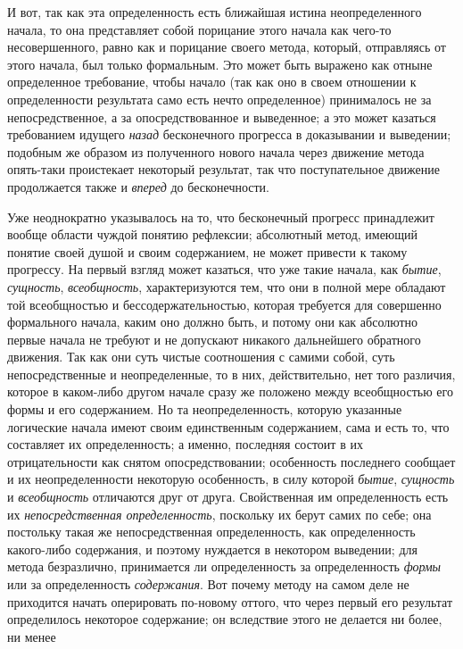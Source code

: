 {{И вот, так как эта определенность есть ближайшая истина
неопределенного начала, то она представляет собой порицание этого начала
как чего-то несовершенного, равно как и порицание своего метода, который,
отправляясь от этого начала, был только формальным. Это может быть выражено
как отныне определенное требование, чтобы начало (так как оно в своем
отношении к определенности результата само есть нечто определенное)
принималось не за непосредственное, а за опосредствованное и
выведенное; а это может казаться требованием идущего
{\em назад} бесконечного
прогресса в доказывании и выведении; подобным же образом из полученного
нового начала через движение метода опять-таки проистекает некоторый
результат, так что поступательное движение продолжается также и
{\em вперед} до бесконечности.

Уже неоднократно указывалось на то, что бесконечный прогресс
принадлежит вообще области чуждой понятию рефлексии; абсолютный метод,
имеющий понятие своей душой и своим содержанием, не может привести к такому
прогрессу. На первый взгляд может казаться, что уже такие начала, как
{\em бытие}, {\em сущность}, {\em всеобщность},
характеризуются тем, что они в полной мере обладают той
всеобщностью и бессодержательностью, которая требуется для совершенно
формального начала, каким оно должно быть, и потому они как абсолютно
первые начала не требуют и не допускают никакого дальнейшего обратного
движения. Так как они суть чистые соотношения с самими собой, суть
непосредственные и неопределенные, то в них, действительно, нет того
различия, которое в каком-либо другом начале сразу же положено между
всеобщностью его формы и его содержанием. Но та неопределенность, которую
указанные логические начала имеют своим единственным содержанием, сама и
есть то, что составляет их определенность; а именно, последняя состоит в их
отрицательности как снятом опосредствовании; особенность последнего
сообщает и их неопределенности некоторую особенность, в силу которой
{\em бытие}, {\em сущность} и {\em всеобщность}
отличаются друг от друга. Свойственная им определенность есть
их {\em непосредственная
определенность}, поскольку их берут самих по себе; она
постольку такая же непосредственная определенность, как определенность
какого-либо содержания, и поэтому нуждается в некотором выведении; для
метода безразлично, принимается ли определенность за определенность
{\em формы} или за определенность {\em содержания}.
Вот почему методу на самом деле не приходится начать
оперировать по-новому оттого, что через первый его результат определилось
некоторое содержание; он вследствие этого не делается ни более, ни менее
}}
